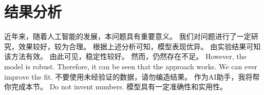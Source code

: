 \section{结果分析}
近年来，随着人工智能的发展，本问题具有重要意义。
我们对问题进行了一定研究，效果较好，较为合理。
根据上述分析可知，模型表现优异。
由实验结果可知该方法有效。
由此可见，稳定性较好。
然而，仍然存在不足。
However, the model is robust.
Therefore, it can be seen that the approach works.
We can ever improve the fit.
不要使用未经验证的数据，请勿编造结果。
作为AI助手，我将帮你完成本节。
Do not invent numbers.
模型具有一定准确性和实用性。
